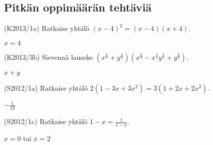 
\subsection*{Pitkän oppimäärän tehtäviä}

\begin{tehtava} (K2013/1a) Ratkaise yhtälö $(x-4)^2=(x-4)(x+4)$.
	\begin{vastaus}
	$x=4$
	\end{vastaus}
\end{tehtava}

\begin{tehtava}
	(K2013/3b) Sievennä lauseke $(x^\frac{1}{3} + y^\frac{1}{3})(x^\frac{2}{3} - x^\frac{1}{3}y^\frac{1}{3} + y^\frac{2}{3})$.
		\begin{vastaus}
		$x+y$
		\end{vastaus}
\end{tehtava}
						
\begin{tehtava} (S2012/1a) Ratkaise yhtälö $2(1-3x+3x^2)=3(1+2x+2x^2)$.
	\begin{vastaus}
		$-\frac{1}{12}$
		\end{vastaus}
\end{tehtava}

\begin{tehtava}(S2012/1c) Ratkaise yhtälö $1-x=\frac{1}{1-x}$.
			\begin{vastaus}
				$x=0$ tai $x=2$
				\end{vastaus}
\end{tehtava}

